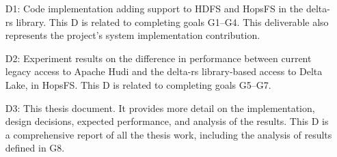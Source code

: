 \begin{enumerate}
    \item[D1:] Code implementation adding support to \gls{HDFS} and \gls{HopsFS} in the delta-rs library. This \gls{D} is related to completing goals G1--G4. This deliverable also represents the project's system implementation contribution.
    \item[D2:] Experiment results on the difference in performance between current legacy access to Apache Hudi and the delta-rs library-based access to Delta Lake, in \gls{HopsFS}.
    This \gls{D} is related to completing goals G5--G7.
    \item[D3:] This thesis document. It provides more detail on the implementation, design decisions, expected performance, and analysis of the results.
    This \gls{D} is a comprehensive report of all the thesis work, including the analysis of results defined in G8.
\end{enumerate}